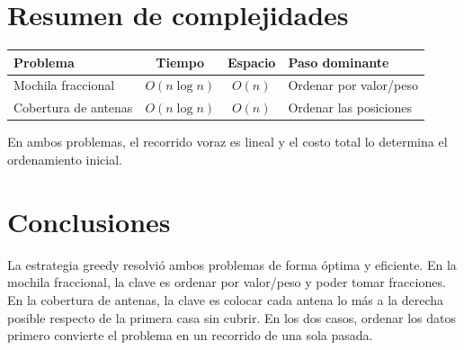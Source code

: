 \documentclass[11pt,a4paper]{article}
\begin{document}
\section{Resumen de complejidades}

\begin{center}
\begin{tabular}{|l|c|c|l|}
\hline
\textbf{Problema} & \textbf{Tiempo} & \textbf{Espacio} & \textbf{Paso dominante} \\ \hline
Mochila fraccional & $O(n \log n)$ & $O(n)$ & Ordenar por valor/peso \\ \hline
Cobertura de antenas & $O(n \log n)$ & $O(n)$ & Ordenar las posiciones \\ \hline
\end{tabular}
\end{center}

En ambos problemas, el recorrido voraz es lineal y el costo total lo determina el ordenamiento inicial.

\section{Conclusiones}

La estrategia greedy resolvió ambos problemas de forma óptima y eficiente. En la mochila fraccional, la clave es ordenar por valor/peso y poder tomar fracciones. En la cobertura de antenas, la clave es colocar cada antena lo más a la derecha posible respecto de la primera casa sin cubrir. En los dos casos, ordenar los datos primero convierte el problema en un recorrido de una sola pasada.
\end{document}
